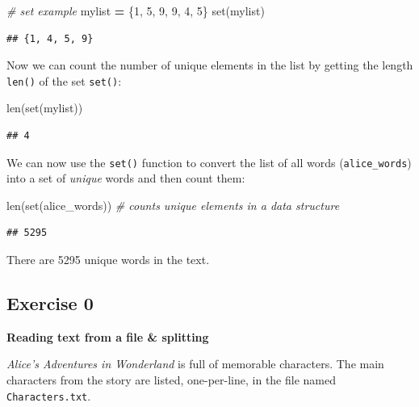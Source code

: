 \documentclass[
]{book}
\newenvironment{Shaded}{\begin{snugshade}}{\end{snugshade}}
\newcommand{\BuiltInTok}[1]{#1}
\newcommand{\CommentTok}[1]{\textcolor[rgb]{0.56,0.35,0.01}{\textit{#1}}}
\newcommand{\DecValTok}[1]{\textcolor[rgb]{0.00,0.00,0.81}{#1}}
\newcommand{\NormalTok}[1]{#1}
\newcommand{\OperatorTok}[1]{\textcolor[rgb]{0.81,0.36,0.00}{\textbf{#1}}}
\begin{document}
\begin{Shaded}
\begin{Highlighting}[]
\CommentTok{\# set example}
\NormalTok{mylist }\OperatorTok{=}\NormalTok{ \{}\DecValTok{1}\NormalTok{, }\DecValTok{5}\NormalTok{, }\DecValTok{9}\NormalTok{, }\DecValTok{9}\NormalTok{, }\DecValTok{4}\NormalTok{, }\DecValTok{5}\NormalTok{\}}
\BuiltInTok{set}\NormalTok{(mylist)}
\end{Highlighting}
\end{Shaded}

\begin{verbatim}
## {1, 4, 5, 9}
\end{verbatim}

Now we can count the number of unique elements in the list by getting the length \texttt{len()} of the set \texttt{set()}:

\begin{Shaded}
\begin{Highlighting}[]
\BuiltInTok{len}\NormalTok{(}\BuiltInTok{set}\NormalTok{(mylist))}
\end{Highlighting}
\end{Shaded}

\begin{verbatim}
## 4
\end{verbatim}

We can now use the \texttt{set()} function to convert the list of all words (\texttt{alice\_words}) into a set of \emph{unique} words and then count them:

\begin{Shaded}
\begin{Highlighting}[]
\BuiltInTok{len}\NormalTok{(}\BuiltInTok{set}\NormalTok{(alice\_words)) }\CommentTok{\# counts unique elements in a data structure}
\end{Highlighting}
\end{Shaded}

\begin{verbatim}
## 5295
\end{verbatim}

There are 5295 unique words in the text.

\hypertarget{exercise-0-3}{%
\subsection{Exercise 0}\label{exercise-0-3}}

\textbf{Reading text from a file \& splitting}

\emph{Alice's Adventures in Wonderland} is full of memorable characters. The main characters from the story are listed, one-per-line, in the file named \texttt{Characters.txt}.
\end{document}
